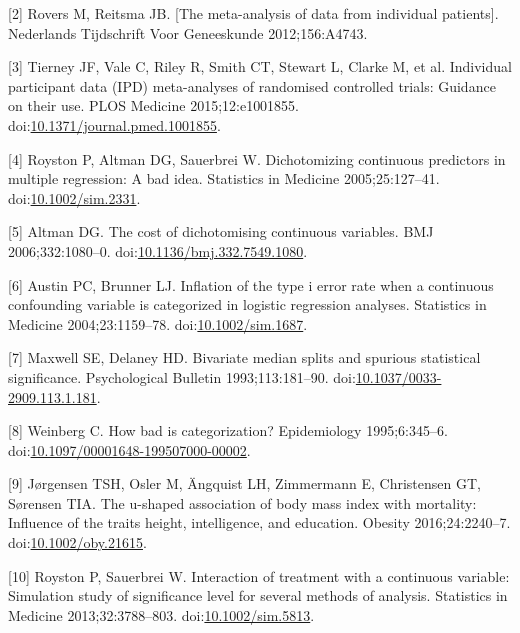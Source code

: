 \documentclass[14pt,]{article}
\begin{document}
\leavevmode\hypertarget{ref-Maroeska_2012}{}%
{[}2{]} Rovers M, Reitsma JB. {[}The meta-analysis of data from
individual patients{]}. Nederlands Tijdschrift Voor Geneeskunde
2012;156:A4743.

\leavevmode\hypertarget{ref-Tierney_2015}{}%
{[}3{]} Tierney JF, Vale C, Riley R, Smith CT, Stewart L, Clarke M, et
al. Individual participant data (IPD) meta-analyses of randomised
controlled trials: Guidance on their use. PLOS Medicine
2015;12:e1001855.
doi:\href{https://doi.org/10.1371/journal.pmed.1001855}{10.1371/journal.pmed.1001855}.

\leavevmode\hypertarget{ref-Royston_2005}{}%
{[}4{]} Royston P, Altman DG, Sauerbrei W. Dichotomizing continuous
predictors in multiple regression: A bad idea. Statistics in Medicine
2005;25:127--41.
doi:\href{https://doi.org/10.1002/sim.2331}{10.1002/sim.2331}.

\leavevmode\hypertarget{ref-Altman_2006}{}%
{[}5{]} Altman DG. The cost of dichotomising continuous variables. BMJ
2006;332:1080--0.
doi:\href{https://doi.org/10.1136/bmj.332.7549.1080}{10.1136/bmj.332.7549.1080}.

\leavevmode\hypertarget{ref-Austin_2004}{}%
{[}6{]} Austin PC, Brunner LJ. Inflation of the type i error rate when a
continuous confounding variable is categorized in logistic regression
analyses. Statistics in Medicine 2004;23:1159--78.
doi:\href{https://doi.org/10.1002/sim.1687}{10.1002/sim.1687}.

\leavevmode\hypertarget{ref-Maxwell_1993}{}%
{[}7{]} Maxwell SE, Delaney HD. Bivariate median splits and spurious
statistical significance. Psychological Bulletin 1993;113:181--90.
doi:\href{https://doi.org/10.1037/0033-2909.113.1.181}{10.1037/0033-2909.113.1.181}.

\leavevmode\hypertarget{ref-Weinberg_1995}{}%
{[}8{]} Weinberg C. How bad is categorization? Epidemiology
1995;6:345--6.
doi:\href{https://doi.org/10.1097/00001648-199507000-00002}{10.1097/00001648-199507000-00002}.

\leavevmode\hypertarget{ref-J_rgensen_2016}{}%
{[}9{]} Jørgensen TSH, Osler M, Ängquist LH, Zimmermann E, Christensen
GT, Sørensen TIA. The u-shaped association of body mass index with
mortality: Influence of the traits height, intelligence, and education.
Obesity 2016;24:2240--7.
doi:\href{https://doi.org/10.1002/oby.21615}{10.1002/oby.21615}.

\leavevmode\hypertarget{ref-royston_interaction_2013}{}%
{[}10{]} Royston P, Sauerbrei W. Interaction of treatment with a
continuous variable: Simulation study of significance level for several
methods of analysis. Statistics in Medicine 2013;32:3788--803.
doi:\href{https://doi.org/10.1002/sim.5813}{10.1002/sim.5813}.
\end{document}
